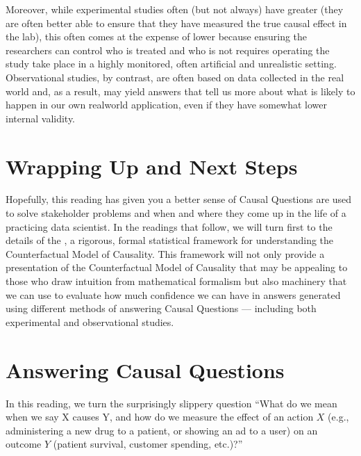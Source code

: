 \documentclass[letterpaper,10pt,english]{jupyterBook}
\begin{document}
\sphinxAtStartPar
Moreover, while experimental studies often (but not always) have greater  (they are often better able to ensure that they have measured the true causal effect in the lab), this often comes at the expense of lower  because ensuring the researchers can control who is treated and who is not requires operating the study take place in a highly monitored, often artificial and unrealistic setting. Observational studies, by contrast, are often based on data collected in the real world and, as a result, may yield answers that tell us more about what is likely to happen in our own real\sphinxhyphen{}world application, even if they have somewhat lower internal validity.


\section{Wrapping Up and Next Steps}
\label{\detokenize{30_questions/35_using_causal_questions:wrapping-up-and-next-steps}}
\sphinxAtStartPar
Hopefully, this reading has given you a better sense of  Causal Questions are used to solve stakeholder problems and when and where they come up in the life of a practicing data scientist. In the readings that follow, we will turn first to the details of the , a rigorous, formal statistical framework for understanding the Counterfactual Model of Causality. This framework will not only provide a presentation of the Counterfactual Model of Causality that may be appealing to those who draw intuition from mathematical formalism but also machinery that we can use to evaluate how much confidence we can have in answers generated using different methods of answering Causal Questions — including both experimental and observational studies.

\sphinxstepscope


\section{Answering Causal Questions}
\label{\detokenize{30_questions/40_answering_causal_questions:answering-causal-questions}}\label{\detokenize{30_questions/40_answering_causal_questions::doc}}
\sphinxAtStartPar
In this reading, we turn the surprisingly slippery question “What do we mean when we say X causes Y, and how do we measure the effect of an action \(X\) (e.g., administering a new drug to a patient, or showing an ad to a user) on an outcome \(Y\) (patient survival, customer spending, etc.)?”
\end{document}
